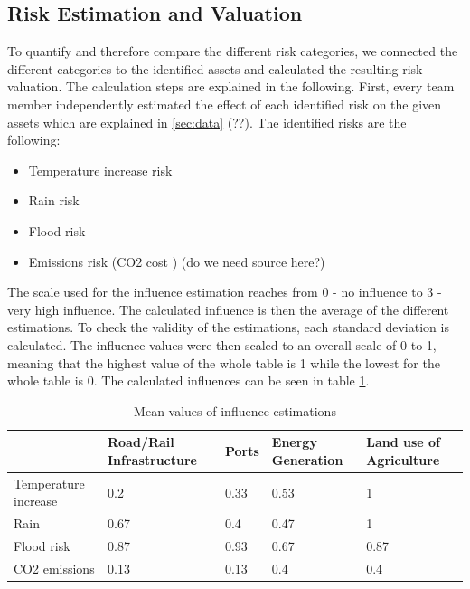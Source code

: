 \documentclass[10pt,a4paper]{article}
\begin{document}
\subsection{Risk Estimation and Valuation}

    To quantify and therefore compare the different risk categories, we connected the different categories to the identified assets and calculated the resulting risk valuation. The calculation steps are explained in the following.
    First, every team member independently estimated the effect of each identified risk on the given assets which are explained in \ref{sec:data} (??). The identified risks are the following:
    \begin{itemize}  
        \item Temperature increase risk
        \item Rain risk
        \item Flood risk
        \item Emissions risk (CO2 cost \cite{noauthor_uk_2022}) (do we need source here?)
    \end{itemize}
    The scale used for the influence estimation reaches from 0 - no influence to 3 - very high influence. The calculated influence is then the average of the different estimations. To check the validity of the estimations, each standard deviation is calculated. The influence values were then scaled to an overall scale of 0 to 1, meaning that the highest value of the whole table is 1 while the lowest for the whole table is 0. The calculated influences can be seen in table \ref{est mean}.
    \begin{table}[H]
    \centering
    \begin{tabular}{|l|l|l|l|l|}
    \hline
                         & Road/Rail Infrastructure & Ports & Energy Generation & Land use of Agriculture \\ \hline
    Temperature increase & 0.2                      & 0.33  & 0.53              & 1                       \\ \hline
    Rain                 & 0.67                     & 0.4   & 0.47              & 1                       \\ \hline
    Flood risk           & 0.87                     & 0.93  & 0.67              & 0.87                    \\ \hline
    CO2 emissions        & 0.13                     & 0.13  & 0.4               & 0.4                    
    \\ \hline
    \end{tabular}
    \caption{Mean values of influence estimations}
    \label{est mean}
    \end{table}
\end{document}
